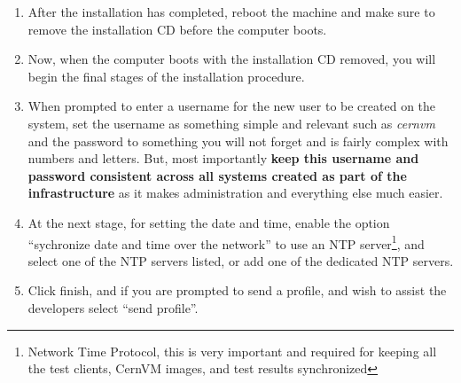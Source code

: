 \begin{enumerate}
\item	After the installation has completed, reboot the machine and make sure to remove the installation CD before the computer boots.

\item	Now, when the computer boots with the installation CD removed, you will begin the final stages of the installation procedure.
		
\item	When prompted to enter a username for the new user to be created on the system, set the username as something simple and relevant
		such as \emph{cernvm} and the password to something you will not forget and is fairly complex with numbers and letters. But, most 
		importantly {\bf keep this username and password consistent across all systems created as part of the infrastructure} as it makes 
		administration and everything else much easier.
		
\item	At the next stage, for setting the date and time, enable the option ``sychronize date and time over the network'' to use an NTP
		server\footnote{Network Time Protocol, this is very important and required for keeping all the test clients, CernVM images,
		and test results synchronized}, and select one of the NTP servers listed, or add one of the \cern dedicated NTP servers.
		
\item	Click finish, and if you are prompted to send a profile, and wish to assist the developers select ``send profile''.
\end{enumerate}


\newpage
